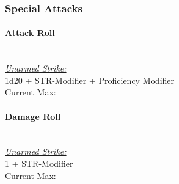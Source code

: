 \documentclass[letterpaper,openany,oneside,twocolumn]{book}
\newcommand{\PATH}{../../}
\begin{document}
\subsubsection*{Special Attacks}
\paragraph*{Attack Roll}\hfill\\
\underline{\textit{Unarmed Strike:}}\\
1d20 + STR-Modifier + Proficiency Modifier\\
\indent Current Max: 
\paragraph*{Damage Roll}\hfill\\
\underline{\textit{Unarmed Strike:}}\\
1 + STR-Modifier\\
\indent Current Max: 


\end{document}
